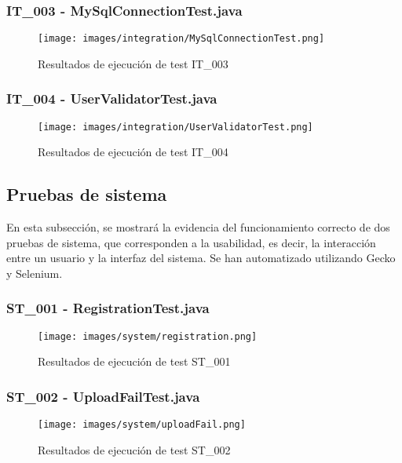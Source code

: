 \documentclass{scrreprt}
\begin{document}
\subsubsection{IT_003 - MySqlConnectionTest.java}

\begin{figure}[H]
	\centering
    \texttt{[image: images/integration/MySqlConnectionTest.png]}
    \caption{Resultados de ejecución de test IT_003}
\end{figure}


\subsubsection{IT_004 - UserValidatorTest.java}

\begin{figure}[H]
	\centering
    \texttt{[image: images/integration/UserValidatorTest.png]}
    \caption{Resultados de ejecución de test IT_004}
\end{figure}


\subsection{Pruebas de sistema}

En esta subsección, se mostrará la evidencia del funcionamiento correcto de dos pruebas de sistema, que corresponden a la usabilidad, es decir, la interacción entre un usuario y la interfaz del sistema. Se han automatizado utilizando Gecko y Selenium.

\subsubsection{ST_001 - RegistrationTest.java}

\begin{figure}[H]
	\centering
    \texttt{[image: images/system/registration.png]}
    \caption{Resultados de ejecución de test ST_001}
\end{figure}

\subsubsection{ST_002 - UploadFailTest.java}

\begin{figure}[H]
	\centering
    \texttt{[image: images/system/uploadFail.png]}
    \caption{Resultados de ejecución de test ST_002}
\end{figure}
\end{document}
